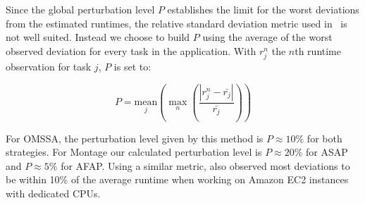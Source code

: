 \documentclass[]{llncs}
\begin{document}
Since the global perturbation level $P$ establishes the limit for the worst
deviations from the estimated runtimes, the relative standard deviation metric
used in~\cite{LeitnerC16} is not well suited. Instead we choose to build $P$
using the average of the worst observed deviation for every task in the
application. With $r_j^n$ the $n$th runtime observation for task $j$, $P$ is set
to:

\begin{equation}
	P =
	\underset{j}{\textrm{mean}}\left(\max_n\left(\frac{|r_j^n-\bar{r_j}|}
	{\bar{r_j}}\right)\right)
\end{equation}

For OMSSA, the perturbation level given by this method is $P\approx{}10\%$ for both
strategies. For Montage  our calculated perturbation level is  $P\approx{}20\%$
for ASAP and $P\approx{}5\%$ for AFAP. Using a similar metric, \cite{pics} also 
observed most deviations to be within 10\% of the average runtime when working on
Amazon EC2 instances with dedicated CPUs.
\end{document}
